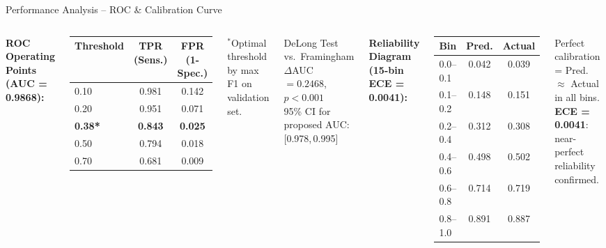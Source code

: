 \documentclass[aspectratio=169]{beamer}
\begin{document}
\begin{frame}{Performance Analysis -- ROC \& Calibration Curve}
  \begin{columns}[T]
      \textbf{ROC Operating Points (AUC = 0.9868):}
      \begin{center}\small
      \begin{tabular}{@{}lcc@{}}
        \toprule
        \textbf{Threshold} & \textbf{TPR (Sens.)} & \textbf{FPR (1-Spec.)} \\
        \midrule
        0.10 & 0.981 & 0.142 \\
        0.20 & 0.951 & 0.071 \\
        \textbf{0.38*} & \textbf{0.843} & \textbf{0.025} \\
        0.50 & 0.794 & 0.018 \\
        0.70 & 0.681 & 0.009 \\
        \bottomrule
      \end{tabular}
      \end{center}
      {\small $^*$Optimal threshold by max F1 on validation set.}
      \vspace{0.2em}
      \begin{block}{DeLong Test vs.\ Framingham}
        $\Delta$AUC $= 0.2468$,\quad $p < 0.001$\\
        95\% CI for proposed AUC: [0.978,\,0.995]
      \end{block}
      \textbf{Reliability Diagram (15-bin ECE = 0.0041):}
      \begin{center}\small
      \begin{tabular}{@{}lcc@{}}
        \toprule
        \textbf{Bin} & \textbf{Pred.} & \textbf{Actual} \\
        \midrule
        0.0--0.1 & 0.042 & 0.039 \\
        0.1--0.2 & 0.148 & 0.151 \\
        0.2--0.4 & 0.312 & 0.308 \\
        0.4--0.6 & 0.498 & 0.502 \\
        0.6--0.8 & 0.714 & 0.719 \\
        0.8--1.0 & 0.891 & 0.887 \\
        \bottomrule
      \end{tabular}
      \end{center}
      {\small Perfect calibration = Pred.\ $\approx$ Actual in all bins.
      \textbf{ECE = 0.0041}: near-perfect reliability confirmed.}
  \end{columns}
\end{frame}
\end{document}
